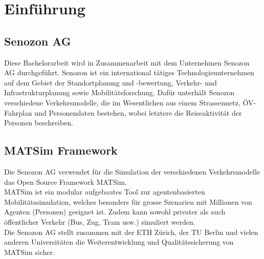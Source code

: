 \chapter{Einführung}

\section{Senozon AG}
Diese Bachelorarbeit wird in Zusammenarbeit mit dem Unternehmen Senozon AG durchgeführt. Senozon ist ein international tätiges Technologieunternehmen auf dem Gebiet der Standortplanung und -bewertung, Verkehr- und Infrastrukturplanung sowie Mobilitätsforschung. Dafür unterhält Senozon verschiedene Verkehrsmodelle, die im Wesentlichen aus einem Strassennetz, ÖV-Fahrplan und Personendaten bestehen, wobei letztere die Reiseaktivität der Personen beschreiben.
\section{MATSim Framework}
Die Senozon AG verwendet für die Simulation der verschiedenen Verkehrsmodelle das Open Source Framework MATSim.\\
MATSim ist ein modular aufgebautes Tool zur agentenbasierten Mobilitätssimulation, welches besonders für grosse Szenarien mit Millionen von Agenten (Personen) geeignet ist. Zudem kann sowohl privater als auch öffentlicher Verkehr (Bus, Zug, Tram usw.) simuliert werden.\\
Die Senozon AG stellt zusammen mit der ETH Zürich, der TU Berlin und vielen anderen Universitäten die Weiterentwicklung und Qualitätssicherung von MATSim sicher.